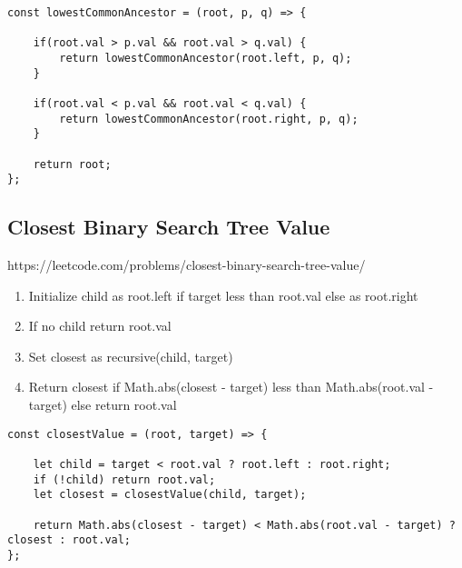 \documentclass[10pt]{article}
\begin{document}
\begin{lstlisting}[title=Solution lowestCommonAncestor, captionpos=t]
const lowestCommonAncestor = (root, p, q) => {
    
    if(root.val > p.val && root.val > q.val) {
        return lowestCommonAncestor(root.left, p, q);
    }
    
    if(root.val < p.val && root.val < q.val) {
        return lowestCommonAncestor(root.right, p, q);
    }
    
    return root;
};
\end{lstlisting}

\medskip %

















\pagebreak
\medskip   
\subsection {Closest Binary Search Tree Value}
https://leetcode.com/problems/closest-binary-search-tree-value/

\begin{enumerate}
	\item  Initialize child as root.left if target less than root.val else as root.right
	\item If no child return root.val
	\item Set closest as recursive(child, target)
	\item Return closest if Math.abs(closest - target) less than Math.abs(root.val - target) else return root.val
\end{enumerate}

\begin{lstlisting}[title=Solution closestValue, captionpos=t]
const closestValue = (root, target) => {
    
    let child = target < root.val ? root.left : root.right;
    if (!child) return root.val;
    let closest = closestValue(child, target);
    
    return Math.abs(closest - target) < Math.abs(root.val - target) ? closest : root.val;
};
\end{lstlisting}

\medskip %
\end{document}

